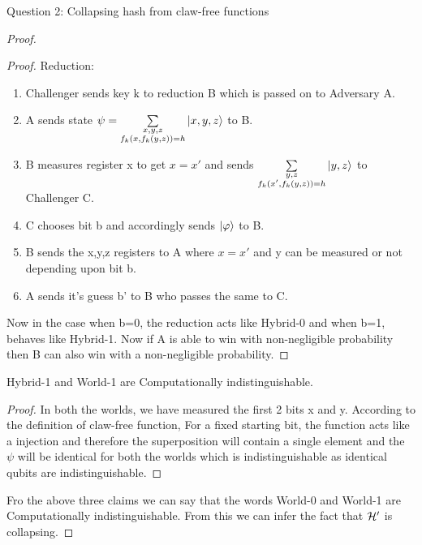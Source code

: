 \begin{solution}{Question 2: Collapsing hash from claw-free functions}
\begin{proof}
\begin{proof}
        Reduction:
        \begin{enumerate}
            \item Challenger sends key k to reduction B which is passed on to Adversary A.
            \item A sends state $\psi = \sum\limits_{\substack{x,y,z\\ f_k(x,f_k(y,z)) = h}} \ket{x,y,z}$ to B.
            \item B measures register x to get $x=x'$ and sends  $\sum\limits_{\substack{y,z\\ f_k(x',f_k(y,z)) = h}}\ket{y,z}$ to Challenger C.
            \item C chooses bit b and accordingly sends $\ket{\varphi}$ to B.
            \item B sends the x,y,z registers to A where $x=x'$ and y can be measured or not depending upon bit b.
            \item A sends it's guess b' to B who passes the same to C.
        \end{enumerate}

        Now in the case when b=0, the reduction acts like Hybrid-0 and when b=1, behaves like Hybrid-1. Now if A is able to win with non-negligible probability then B can also win with a non-negligible probability.

    \end{proof}

    \begin{claim}
    Hybrid-1 and World-1 are Computationally indistinguishable.
    \end{claim}

    \begin{proof}
        In both the worlds, we have measured the first 2 bits x and y. According to the definition of claw-free function, For a fixed starting bit, the function acts like a injection and therefore the superposition will contain a single element and the $\psi$ will be identical for both the worlds which is indistinguishable as identical qubits are indistinguishable.
    \end{proof}

    Fro the above three claims we can say that the words World-0 and World-1 are Computationally indistinguishable. From this we can infer the fact that $\mathcal{H}'$ is collapsing.
    \end{proof}
\end{solution}

